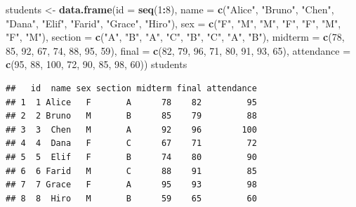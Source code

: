 \documentclass[
]{article}
\newenvironment{Shaded}{\begin{snugshade}}{\end{snugshade}}
\newcommand{\AttributeTok}[1]{\textcolor[rgb]{0.13,0.29,0.53}{#1}}
\newcommand{\DecValTok}[1]{\textcolor[rgb]{0.00,0.00,0.81}{#1}}
\newcommand{\FunctionTok}[1]{\textcolor[rgb]{0.13,0.29,0.53}{\textbf{#1}}}
\newcommand{\NormalTok}[1]{#1}
\newcommand{\OtherTok}[1]{\textcolor[rgb]{0.56,0.35,0.01}{#1}}
\newcommand{\SpecialCharTok}[1]{\textcolor[rgb]{0.81,0.36,0.00}{\textbf{#1}}}
\newcommand{\StringTok}[1]{\textcolor[rgb]{0.31,0.60,0.02}{#1}}
\begin{document}
\begin{Shaded}
\begin{Highlighting}[]
\NormalTok{students }\OtherTok{\textless{}{-}} \FunctionTok{data.frame}\NormalTok{(}\AttributeTok{id =} \FunctionTok{seq}\NormalTok{(}\DecValTok{1}\SpecialCharTok{:}\DecValTok{8}\NormalTok{),}
\AttributeTok{name =} \FunctionTok{c}\NormalTok{(}\StringTok{"Alice"}\NormalTok{, }\StringTok{"Bruno"}\NormalTok{, }\StringTok{"Chen"}\NormalTok{, }\StringTok{"Dana"}\NormalTok{, }\StringTok{"Elif"}\NormalTok{, }\StringTok{"Farid"}\NormalTok{, }\StringTok{"Grace"}\NormalTok{, }\StringTok{"Hiro"}\NormalTok{), }
\AttributeTok{sex =} \FunctionTok{c}\NormalTok{(}\StringTok{"F"}\NormalTok{, }\StringTok{"M"}\NormalTok{, }\StringTok{"M"}\NormalTok{, }\StringTok{"F"}\NormalTok{, }\StringTok{"F"}\NormalTok{, }\StringTok{"M"}\NormalTok{, }\StringTok{"F"}\NormalTok{, }\StringTok{"M"}\NormalTok{),}
\AttributeTok{section =} \FunctionTok{c}\NormalTok{(}\StringTok{"A"}\NormalTok{, }\StringTok{"B"}\NormalTok{, }\StringTok{"A"}\NormalTok{, }\StringTok{"C"}\NormalTok{, }\StringTok{"B"}\NormalTok{, }\StringTok{"C"}\NormalTok{, }\StringTok{"A"}\NormalTok{, }\StringTok{"B"}\NormalTok{),}
\AttributeTok{midterm =} \FunctionTok{c}\NormalTok{(}\DecValTok{78}\NormalTok{, }\DecValTok{85}\NormalTok{, }\DecValTok{92}\NormalTok{, }\DecValTok{67}\NormalTok{, }\DecValTok{74}\NormalTok{, }\DecValTok{88}\NormalTok{, }\DecValTok{95}\NormalTok{, }\DecValTok{59}\NormalTok{),}
\AttributeTok{final =} \FunctionTok{c}\NormalTok{(}\DecValTok{82}\NormalTok{, }\DecValTok{79}\NormalTok{, }\DecValTok{96}\NormalTok{, }\DecValTok{71}\NormalTok{, }\DecValTok{80}\NormalTok{, }\DecValTok{91}\NormalTok{, }\DecValTok{93}\NormalTok{, }\DecValTok{65}\NormalTok{),}
\AttributeTok{attendance =} \FunctionTok{c}\NormalTok{(}\DecValTok{95}\NormalTok{, }\DecValTok{88}\NormalTok{, }\DecValTok{100}\NormalTok{, }\DecValTok{72}\NormalTok{, }\DecValTok{90}\NormalTok{, }\DecValTok{85}\NormalTok{, }\DecValTok{98}\NormalTok{, }\DecValTok{60}\NormalTok{))}
\NormalTok{students}
\end{Highlighting}
\end{Shaded}

\begin{verbatim}
##   id  name sex section midterm final attendance
## 1  1 Alice   F       A      78    82         95
## 2  2 Bruno   M       B      85    79         88
## 3  3  Chen   M       A      92    96        100
## 4  4  Dana   F       C      67    71         72
## 5  5  Elif   F       B      74    80         90
## 6  6 Farid   M       C      88    91         85
## 7  7 Grace   F       A      95    93         98
## 8  8  Hiro   M       B      59    65         60
\end{verbatim}
\end{document}
